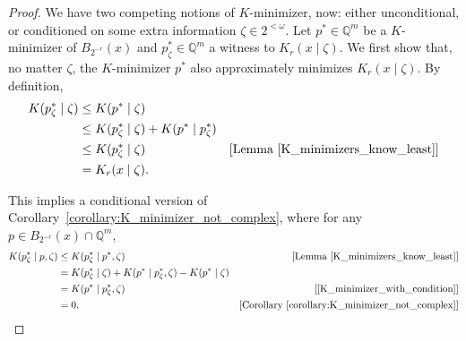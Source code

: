 \begin{proof}
    We have two competing notions of $K$-minimizer, now: either unconditional, or conditioned on some extra information $\zeta \in 2^{< \omega}$. Let $p^* \in \mathbb{Q}^m$ be a $K$-minimizer of $B_{2^{-r}}(x)$ and $p^*_\zeta \in \mathbb{Q}^m$ a witness to $K_r(x \mid \zeta)$. We first show that, no matter $\zeta$, the $K$-minimizer $p^*$ also approximately minimizes $K_r(x \mid \zeta)$. By definition,
    \begin{align}
        K(p^*_\zeta \mid \zeta) &\leq K(p^* \mid \zeta) \nonumber \\
        &\leq K(p^*_\zeta \mid \zeta) + K(p^* \mid p^*_\zeta) \nonumber \\
        &\leq K(p^*_\zeta \mid \zeta) & \nonumber [\text{Lemma~\ref{K_minimizers_know_least}}]\\
        &= K_r(x \mid \zeta). 
        \label{K_minimizer_with_condition}
    \end{align}

    This implies a conditional version of Corollary~\ref{corollary:K_minimizer_not_complex}, where for any $p \in B_{2^{-r}}(x) \cap \mathbb{Q}^m$,
    \begin{align}
        K(p^*_\zeta \mid p, \zeta) &\leq K(p^*_\zeta \mid p^*, \zeta) & [\text{Lemma~\ref{K_minimizers_know_least}}] \nonumber \\
        &= K(p^*_\zeta \mid \zeta) + K(p^* \mid p^*_\zeta, \zeta) - K(p^* \mid \zeta) \nonumber\\
        &= K(p^* \mid p^*_\zeta, \zeta) & [\text{\eqref{K_minimizer_with_condition}}] \nonumber \\
        &= 0. & [\text{Corollary~\ref{corollary:K_minimizer_not_complex}}] 
        \label{K_minimizers_with_condition_know_least_when_conditioned}
    \end{align}


\end{proof}
